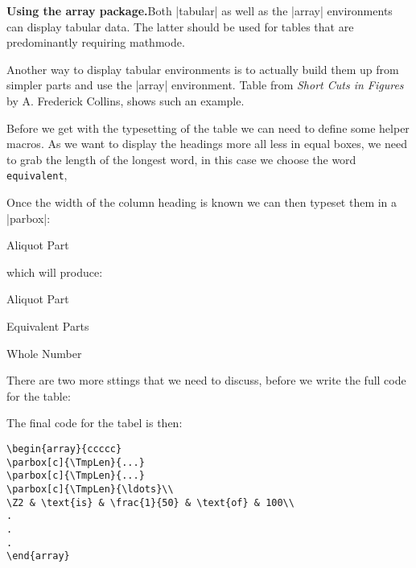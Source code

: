 \begin{multicols}{2}
\textbf{\Large Using the array package.}\quad Both |tabular| as well as the |array| environments can display tabular data. The latter should be used for tables that are predominantly requiring mathmode.

Another way to display tabular environments is to actually build them up from simpler
parts and use the |array| environment.  Table   from \textit{Short Cuts in Figures} by A. Frederick Collins, shows such an example.

Before we get with the typesetting of the table we can need to define some helper macros. As we want to display the headings more all less in equal boxes, we need to grab the length of the longest word, in this case we choose the word \texttt{equivalent},
\emphasis{\settowidth,\TmpLen}
\begin{teXXX}
\settowidth{\TmpLen}{Equivalent}
\end{teXXX}
%
%
\settowidth{\TmpLen}{Equivalent}

Once the width of the column heading is known we can then typeset them in a |parbox|:

\begin{teXXX}
\parbox[c]{\TmpLen}{\centering Aliquot Part}
\end{teXXX}
which will produce: 
\medskip

\colorbox{gray!10}{\parbox[c]{\TmpLen}{\centering Aliquot Part}\hspace{0.5cm}
\parbox[c]{\TmpLen}{\smallskip\centering Equivalent Parts}
\hspace{0.5cm}\parbox[c]{\TmpLen}{\centering Whole Number}
}

There are two more sttings that we need to discuss, before we write the full code for the table:

\begin{teXXX}
\renewcommand\arraystretch{1.2}
\setlength\arraycolsep{0.5em}
\end{teXXX}

The final code for the tabel is then:

\begin{verbatim}
\begin{array}{ccccc}
\parbox[c]{\TmpLen}{...}
\parbox[c]{\TmpLen}{...} 
\parbox[c]{\TmpLen}{\ldots}\\
\Z2 & \text{is} & \frac{1}{50} & \text{of} & 100\\
.
.
.
\end{array}
\end{verbatim}


\end{multicols}
